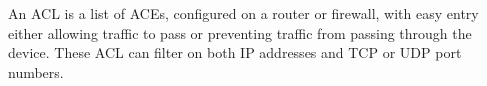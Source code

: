 \label{chap:firewalls}


An \acf{ACL} is a list of \acfp{ACE}, configured on a router or firewall, with easy entry either allowing traffic to pass or preventing traffic from passing through the device.
These \acl{ACL} can filter on both \acs{IP} addresses and \acs{TCP} or \acs{UDP} port numbers.






